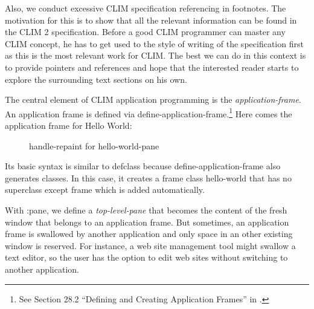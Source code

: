 \documentclass[twocolumn,a4paper]{article}
\newcommand {\concept} [1] {{\sl #1}\index{#1}}
\newcommand {\code}[1]{{\sffamily #1}}
\newcommand {\CLIM}{{\small CLIM}}
\let\class\code
\let\method\code
\begin{document}
Also, we conduct excessive \CLIM{} specification referencing in footnotes. The motivation for this is to show that all the relevant information can be found in the \CLIM{} 2 specification\cite{clim-spec}. Before a good \CLIM{} programmer can master any \CLIM{} concept, he has to get used to the style of writing of the specification first as this is the most relevant work for \CLIM{}. The best we can do in this context is to provide pointers and references and hope that the interested reader starts to explore the surrounding text sections on his own.

The central element of \CLIM{} application programming is the \concept{application-frame}. An application frame is defined via \code{define-application-frame}.\footnote{See Section 28.2 ``Defining and Creating Application Frames'' in \cite{clim-spec}.} Here comes the application frame for Hello World:
\lstset{style=inlinestyle}


\begin{figure*}
\lstset{style=framestyle}

\caption{\method{handle-repaint} for \class{hello-world-pane}}\label{hello-world-repaint}
\end{figure*}


Its basic syntax is similar to \code{defclass} because \code{define-application-frame} also generates classes. In this case, it creates a frame class \class{hello-world} that has no superclass except \class{frame} which is added automatically.

With \code{:pane}, we define a \concept{top-level-pane} that becomes the content of the fresh window that belongs to an application frame. But sometimes, an application frame is swallowed by another application and only space in an other existing window is reserved. For instance, a web site management tool might swallow a text editor, so the user has the option to edit web sites without switching to another application.

\end{document}
